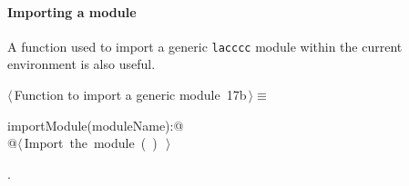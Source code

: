 \documentclass[11pt,oneside]{article}	%
\begin{document}
\paragraph{Importing a module} A function used to import a generic \texttt{lacccc} module within the current environment is also useful.
\begin{flushleft} \small
\begin{minipage}{\linewidth} \label{scrap30}
\protect{}$\langle\,$Function to import a generic module\nobreak\ {\footnotesize 17b}$\,\rangle\equiv$
\vspace{-1ex}
\begin{list}{}{} \item
\mbox{}\verb@def importModule(moduleName):@\\
\mbox{}\verb@   @\hbox{$\langle\,$Import the module\nobreak\ ({\footnotesize {}\label{scrap31}
 }\mbox{}\verb@moduleName@ ) {\footnotesize {}}$\,\rangle$}\verb@@\\
\mbox{}\verb@@{\NWsep}
\end{list}
\vspace{-1ex}
\footnotesize\addtolength{\baselineskip}{-1ex}
\begin{list}{}{\setlength{\itemsep}{-\parsep}\setlength{\itemindent}{-\leftmargin}}
\item {\NWtxtMacroNoRef}.
\end{list}
\end{minipage}\\[4ex]
\end{flushleft}




\end{document}
